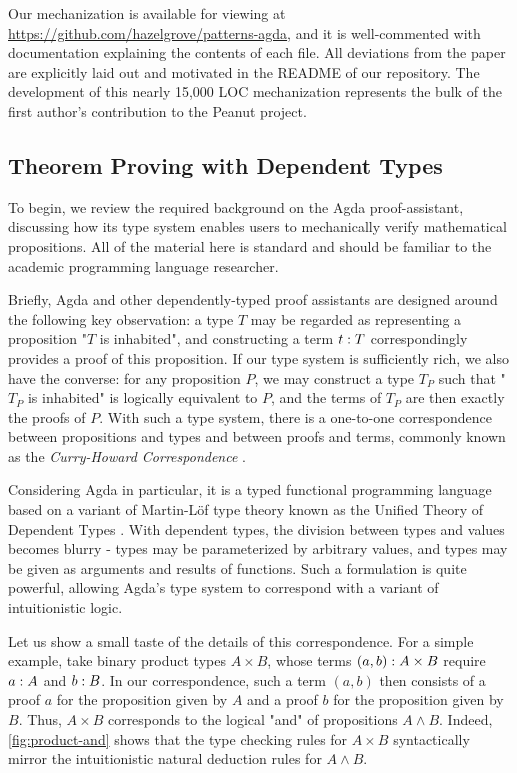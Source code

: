  Our mechanization is available for viewing at \href{https://github.com/hazelgrove/patterns-agda}{https://github.com/hazelgrove/patterns-agda}, and it is well-commented with documentation explaining the contents of each file. All deviations from the paper are explicitly laid out and motivated in the README of our repository. The development of this nearly 15,000 LOC mechanization represents the bulk of the first author's contribution to the Peanut project.
 
\subsection{Theorem Proving with Dependent Types}\label{sec:dependent-types}
To begin, we review the required background on the Agda proof-assistant, discussing how its type system enables users to mechanically verify mathematical propositions. All of the material here is standard and should be familiar to the academic programming language researcher.

Briefly, Agda and other dependently-typed proof assistants are designed around the following key observation: a type $T$ may be regarded as representing a proposition "$T$ is inhabited", and constructing a term $t : T$ correspondingly provides a proof of this proposition. If  our type system is sufficiently rich, we also have the converse: for any proposition $P$, we may construct a type $T_P$ such that "$T_P$ is inhabited" is logically equivalent to $P$, and the terms of $T_P$ are then exactly the proofs of $P$. With such a type system, there is a one-to-one correspondence between propositions and types and between proofs and terms, commonly known as the \emph{Curry-Howard Correspondence} \cite{howard1980formulae}. 

Considering Agda in particular, it is a typed functional programming language based on a variant of Martin-L\"of type theory \cite{DBLP:books/daglib/0000395} known as the Unified Theory of Dependent Types \cite{DBLP:books/daglib/0078470, norell:thesis}. With dependent types, the division between types and values becomes blurry - types may be parameterized by arbitrary values, and types may be given as arguments and results of functions. Such a formulation is quite powerful, allowing Agda's type system to correspond with a variant of intuitionistic logic. 

Let us show a small taste of the details of this correspondence. For a simple example, take binary product types $A \times B$, whose terms $(a , b) : A \times B$ require $a : A$ and $b : B$. In our correspondence, such a term $(a, b)$ then consists of a proof $a$ for the proposition given by $A$ and a proof $b$ for the proposition given by $B$. Thus, $A \times B$ corresponds to the logical "and" of propositions $A \land B$. Indeed, \autoref{fig:product-and} shows that the type checking rules for $A \times B$ syntactically mirror the intuitionistic natural deduction rules for $A \land B$.

